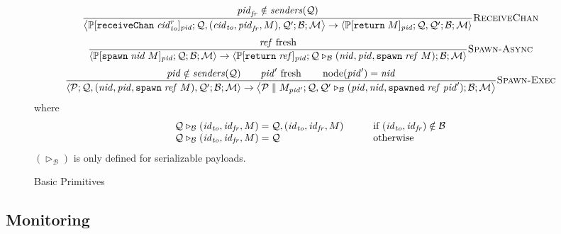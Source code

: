 \documentclass{article}
\newcommand{\sReturn}{\mathtt{return}}
\newcommand{\sSpawn}{\mathtt{spawn}}
\newcommand{\sReceiveChan}{\mathtt{receiveChan}}
\DeclareMathOperator{\sNodeOf}{node}
\newcommand{\sSpawned}{\mathtt{spawned}}
\newcommand{\sExtend}[1]{\mathrel{\triangleright_{#1}}}
\newcommand{\sPar}{\mathrel{\parallel}}
\newcommand{\sNid}{\ensuremath{\mathit{nid}}}
\newcommand{\sPid}{\ensuremath{\mathit{pid}}}
\newcommand{\sCid}{\ensuremath{\mathit{cid}}}
\newcommand{\sId}{\ensuremath{\mathit{id}}}
\newcommand{\sRef}{\ensuremath{\mathit{ref}}}
\newcommand{\sSystem}[4]{\left\langle #1 ; #2 ; #3 ; #4 \right\rangle}
\newcommand{\sQueue}{\mathcal{Q}}
\newcommand{\sProcesses}{\mathcal{P}}
\newcommand{\sBlacklist}{\mathcal{B}}
\newcommand{\sMonitors}{\mathcal{M}}
\newcommand{\sCtxt}[1]{\mathbb{#1}}
\newcommand{\sSenders}{\mathit{senders}}
\begin{document}
\begin{figure}
\begin{equation*}
\frac{
  \sPid_{\mathit{fr}} \notin \sSenders(\sQueue)
}{
  \sSystem{\sCtxt{P}[ \sReceiveChan \; \sCid_\mathit{to}^r ]_{\sPid}}
          {\sQueue, (\sCid_\mathit{to}, \sPid_\mathit{fr}, M), \sQueue'}
          {\sBlacklist}
          {\sMonitors}
\rightarrow
  \sSystem{\sCtxt{P}[ \sReturn \; M ]_{\sPid}}
          {\sQueue, \sQueue'}
          {\sBlacklist}
          {\sMonitors}
} \textsc{ReceiveChan}
\end{equation*}
%
\begin{equation*}
\frac{
  \sRef \text{ fresh} 
}{
  \sSystem{\sCtxt{P}[ \sSpawn \; \sNid \; M ]_\sPid}
          {\sQueue}
          {\sBlacklist}
          {\sMonitors}
\rightarrow          
  \sSystem{\sCtxt{P}[ \sReturn \; \sRef ]_\sPid}
          {\sQueue \sExtend{\sBlacklist} (\sNid, \sPid, \sSpawn \; \sRef \; M)}
          {\sBlacklist}
          {\sMonitors}
} \textsc{Spawn-Async}
\end{equation*}
%
\begin{equation*}
\frac{
  \sPid \notin \sSenders(\sQueue)
\qquad
  \sPid' \text{ fresh} 
\qquad
  \sNodeOf(\sPid') = \sNid
}{
  \sSystem{\sProcesses}
          {\sQueue, (\sNid, \sPid, \sSpawn \; \sRef \; M), \sQueue'}
          {\sBlacklist}
          {\sMonitors}
\rightarrow
  \sSystem{\sProcesses \sPar M_{\sPid'}}
          {\sQueue, \sQueue' \sExtend{\sBlacklist} (\sPid, \sNid, \sSpawned \; \sRef \; \sPid')}
          {\sBlacklist}
          {\sMonitors}
} \textsc{Spawn-Exec}
\end{equation*}
%
where
%
\begin{equation*}
\begin{array}{l@{\;=\;}l@{\hspace{3em}}l}
  \sQueue \sExtend{\sBlacklist} (\sId_\mathit{to}, \sId_\mathit{fr}, M) 
& 
  \sQueue,  (\sId_\mathit{to}, \sId_\mathit{fr}, M)
&
  \text{if } (\sId_\mathit{to}, \sId_\mathit{fr}) \notin \sBlacklist
\\
  \sQueue \sExtend{\sBlacklist} (\sId_\mathit{to}, \sId_\mathit{fr}, M) 
& 
  \sQueue
&
  \text{otherwise}
\end{array}
\end{equation*}
%
$(\sExtend{\sBlacklist})$ is only defined for serializable payloads.
\caption{\label{fig:basic}Basic Primitives}
\end{figure}

\subsection{Monitoring}
\end{document}
